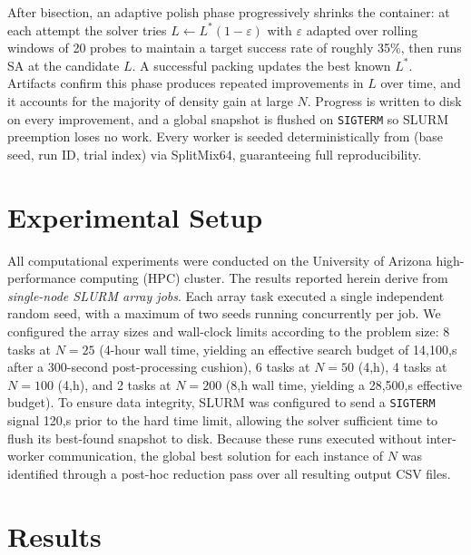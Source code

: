 \documentclass[10pt,twocolumn]{article}
\begin{document}
After bisection, an adaptive polish phase progressively shrinks the
container: at each attempt the solver tries $L \leftarrow L^*(1 -
\varepsilon)$ with $\varepsilon$ adapted over rolling windows of 20
probes to maintain a target success rate of roughly 35\%, then runs SA
at the candidate $L$. A successful packing updates the best known
$L^*$. Artifacts confirm this phase produces repeated improvements in
$L$ over time, and it accounts for the majority of density gain at
large $N$. Progress is written to disk on every improvement, and a
global snapshot is flushed on \texttt{SIGTERM} so SLURM preemption
loses no work. Every worker is seeded deterministically from (base
seed, run ID, trial index) via SplitMix64, guaranteeing full
reproducibility.

\section{Experimental Setup}
\label{sec:experiments}

All computational experiments were conducted on the University of
 Arizona high-performance computing (HPC) cluster.
  The results reported herein derive from
   \emph{single-node SLURM array jobs}.
    Each array task executed a single independent random seed,
     with a maximum of two seeds running concurrently per job. 
     We configured the array sizes and wall-clock limits according 
     to the problem size: 8 tasks at $N = 25$ 
     (4-hour wall time, yielding an effective search budget of
      14{,}100,s after a 300-second post-processing cushion),
       6 tasks at $N = 50$ (4,h), 4 tasks at $N = 100$ (4,h),
        and 2 tasks at $N = 200$ (8,h wall time, yielding a
         28{,}500,s effective budget). To ensure data integrity,
          SLURM was configured to send a \texttt{SIGTERM}
           signal 120,s prior to the hard time limit, allowing the solver
            sufficient time to flush its best-found snapshot to disk.
             Because these runs executed without inter-worker communication,
              the global best solution for each instance of $N$
               was identified through
 a post-hoc reduction pass over all resulting output CSV files.
\section{Results}
\label{sec:results}
\end{document}
